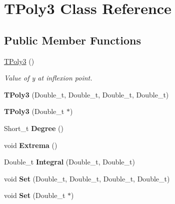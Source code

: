 \hypertarget{classTPoly3}{\section{T\-Poly3 Class Reference}
\label{classTPoly3}
}
\subsection*{Public Member Functions}
\begin{DoxyCompactItemize}
\item 
\hypertarget{classTPoly3_a5b612783e0bb44b124e0098aee6a88f0}{\hyperlink{classTPoly3_a5b612783e0bb44b124e0098aee6a88f0}{T\-Poly3} ()}\label{classTPoly3_a5b612783e0bb44b124e0098aee6a88f0}

\begin{DoxyCompactList}\small\item\em Value of y at inflexion point. \end{DoxyCompactList}\item 
\hypertarget{classTPoly3_a028a5983a69bf4026b933242c7462194}{{\bfseries T\-Poly3} (Double\-\_\-t, Double\-\_\-t, Double\-\_\-t, Double\-\_\-t)}\label{classTPoly3_a028a5983a69bf4026b933242c7462194}

\item 
\hypertarget{classTPoly3_ac7e8ffb5811952361e398917a009a6ea}{{\bfseries T\-Poly3} (Double\-\_\-t $\ast$)}\label{classTPoly3_ac7e8ffb5811952361e398917a009a6ea}

\item 
\hypertarget{classTPoly3_a790244de7f8e57fd6646e782a97007f0}{Short\-\_\-t {\bfseries Degree} ()}\label{classTPoly3_a790244de7f8e57fd6646e782a97007f0}

\item 
\hypertarget{classTPoly3_a4f3c7938a29799215b68895eb4016fd5}{void {\bfseries Extrema} ()}\label{classTPoly3_a4f3c7938a29799215b68895eb4016fd5}

\item 
\hypertarget{classTPoly3_a411197d8138b879f70960da319d96e02}{Double\-\_\-t {\bfseries Integral} (Double\-\_\-t, Double\-\_\-t)}\label{classTPoly3_a411197d8138b879f70960da319d96e02}

\item 
\hypertarget{classTPoly3_adc456c40946d54f46a7e31f356fcf67e}{void {\bfseries Set} (Double\-\_\-t, Double\-\_\-t, Double\-\_\-t, Double\-\_\-t)}\label{classTPoly3_adc456c40946d54f46a7e31f356fcf67e}

\item 
\hypertarget{classTPoly3_a09880064095a49b705774d97eb630e30}{void {\bfseries Set} (Double\-\_\-t $\ast$)}\label{classTPoly3_a09880064095a49b705774d97eb630e30}


\end{DoxyCompactItemize}
